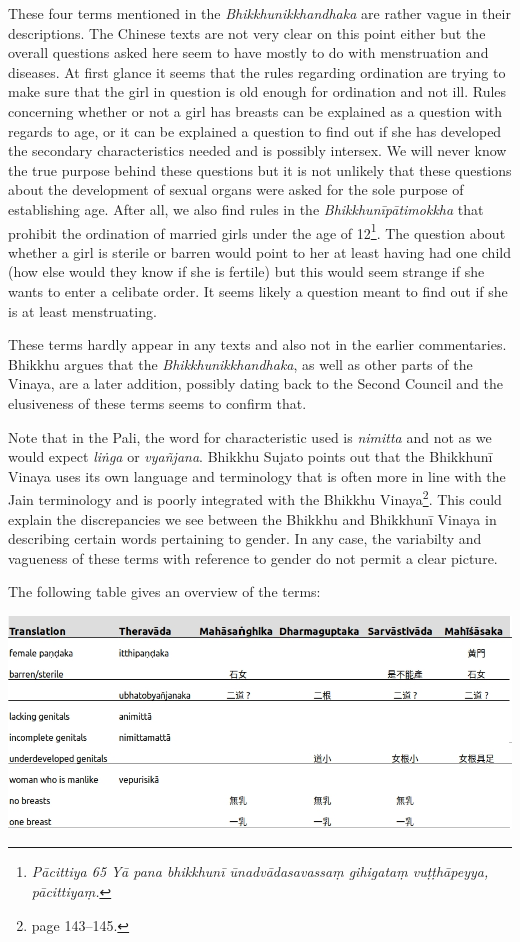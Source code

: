 These four terms mentioned in the {\em Bhikkhunikkhandhaka} are rather vague in their descriptions. The Chinese texts are not very clear on this point either but the overall questions asked here seem to have mostly to do with menstruation and diseases. At first glance it seems that the rules regarding ordination are trying to make sure that the girl in question is old enough for ordination and not ill. Rules concerning whether or not a girl has breasts can be explained as a question with regards to age, or it can be explained a question to find out if she has developed the secondary characteristics needed and is possibly intersex. We will never know the true purpose behind these questions but it is not unlikely that these questions about the development of sexual organs were asked for the sole purpose of establishing age. After all, we also find rules in the {\em Bhikkhunīpātimokkha} that prohibit the ordination of married girls under the age of 12\footnote{{\em Pācittiya 65 Yā pana bhikkhunī ūnad­vāda­sa­vassaṃ gihigataṃ vuṭṭhāpeyya, pācittiyaṃ.}}. The question about whether a girl is sterile or barren would point to her at least having had one child (how else would they know if she is fertile) but this would seem strange if she wants to enter a celibate order. It seems likely a question meant to find out if she is at least menstruating. 

These terms hardly appear in any texts and also not in the earlier commentaries. Bhikkhu \cite{sujato2009} argues that the {\em Bhikkhunikkhandhaka}, as well as other parts of the Vinaya, are a later addition, possibly dating back to the Second Council and the elusiveness of these terms seems to confirm that.

Note that in the Pali, the word for characteristic used is {\em nimitta} and not as we would expect {\em liṅga} or {\em vyañ­jana}. Bhikkhu Sujato points out that the Bhikkhunī Vinaya uses its own language and terminology that is often more in line with the Jain terminology and is poorly integrated with the Bhikkhu Vinaya\footnote{\cite{sujato2009} page 143–145.}. This could explain the discrepancies we see between the Bhikkhu and Bhikkhunī Vinaya in describing certain words pertaining to gender. In any case, the variabilty and vagueness of these terms with reference to gender do not permit a clear picture. 

The following table gives an overview of the terms:

\bigskip
\includegraphics[width=\linewidth]{female.jpg}
\label{female}

